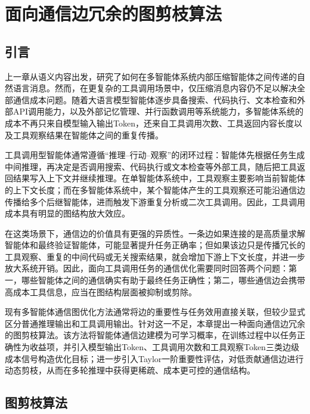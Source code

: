 
\chapter{面向通信边冗余的图剪枝算法}
\label{chap:tool-aware-pruning}

\section{引言}

上一章从语义内容出发，研究了如何在多智能体系统内部压缩智能体之间传递的自然语言消息。然而，在更复杂的工具调用场景中，仅压缩消息内容仍不足以解决全部通信成本问题。随着大语言模型智能体逐步具备搜索、代码执行、文本检查和外部API调用能力\cite{ref17,ref18}，以及外部记忆管理、并行函数调用等系统能力\cite{ref83,ref84}，多智能体系统的成本不再只来自模型输入输出Token，还来自工具调用次数、工具返回内容长度以及工具观察结果在智能体之间的重复传播。

工具调用型智能体通常遵循``推理--行动--观察''的闭环过程\cite{ref23}：智能体先根据任务生成中间推理，再决定是否调用搜索、代码执行或文本检查等外部工具，随后把工具返回结果写入上下文并继续推理。在单智能体系统中，工具观察主要影响当前智能体的上下文长度；而在多智能体系统中，某个智能体产生的工具观察还可能沿通信边传播给多个后继智能体，进而触发下游重复分析或二次工具调用。因此，工具调用成本具有明显的图结构放大效应。

在这类场景下，通信边的价值具有更强的异质性。一条边如果连接的是高质量求解智能体和最终验证智能体，可能显著提升任务正确率；但如果该边只是传播冗长的工具观察、重复的中间代码或无关搜索结果，就会增加下游上下文长度，并进一步放大系统开销。因此，面向工具调用任务的通信优化需要同时回答两个问题：第一，哪些智能体之间的通信确实有助于最终任务正确性；第二，哪些通信边会携带高成本工具信息，应当在图结构层面被抑制或剪除。

现有多智能体通信图优化方法通常将边的重要性与任务效用直接关联\cite{ref43,ref48}，但较少显式区分普通推理输出和工具调用输出。针对这一不足，本章提出一种面向通信边冗余的图剪枝算法。该方法将智能体通信边建模为可学习概率，在训练过程中以任务正确性为收益项，并引入模型输出Token、工具调用次数和工具观察Token三类边级成本信号构造优化目标；进一步引入Taylor一阶重要性评估\cite{ref74,ref102,ref104}，对低贡献通信边进行动态剪枝，从而在多轮推理中获得更稀疏、成本更可控的通信结构。


\section{图剪枝算法}

